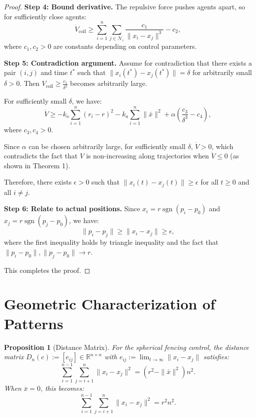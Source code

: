 \documentclass{ctexart}
\DeclareMathOperator{\sgn}{sgn}
\newtheorem{proposition}[theorem]{Proposition}
\begin{document}
\begin{proof}
\textbf{Step 4: Bound derivative.}
The repulsive force pushes agents apart, so for sufficiently close agents:
\begin{equation}
\dot{V}_{\text{coll}} \geq \sum_{i=1}^{n} \sum_{j \in \mathcal{N}_i} \frac{c_1}{\|x_i - x_j\|^3} - c_2,
\end{equation}
where $c_1, c_2 > 0$ are constants depending on control parameters.

\textbf{Step 5: Contradiction argument.}
Assume for contradiction that there exists a pair $(i,j)$ and time $t^*$ such that $\|x_i(t^*) - x_j(t^*)\| = \delta$ for arbitrarily small $\delta > 0$.
Then $V_{\text{coll}} \geq \frac{c_1}{\delta^2}$ becomes arbitrarily large.

For sufficiently small $\delta$, we have:
\begin{equation}
\dot{V} \geq -k_o \sum_{i=1}^{n} (r_i - r)^2 - k_a \sum_{i=1}^{n} \|\bar{x}\|^2 + \alpha \left( \frac{c_3}{\delta^3} - c_4 \right),
\end{equation}
where $c_3, c_4 > 0$.

Since $\alpha$ can be chosen arbitrarily large, for sufficiently small $\delta$, $\dot{V} > 0$, which contradicts the fact that $V$ is non-increasing along trajectories when $\dot{V} \leq 0$ (as shown in Theorem 1).

Therefore, there exists $\epsilon > 0$ such that $\|x_i(t) - x_j(t)\| \geq \epsilon$ for all $t \geq 0$ and all $i \neq j$.

\textbf{Step 6: Relate to actual positions.}
Since $x_i = r \sgn(p_i - p_0)$ and $x_j = r \sgn(p_j - p_0)$, we have:
\begin{equation}
\|p_i - p_j\| \geq \|x_i - x_j\| \geq \epsilon,
\end{equation}
where the first inequality holds by triangle inequality and the fact that $\|p_i - p_0\|, \|p_j - p_0\| \to r$.

This completes the proof.
\end{proof}



\section{Geometric Characterization of Patterns}

\begin{proposition}[Distance Matrix]
For the spherical fencing control, the distance matrix $D_n(c) := [e_{ij}] \in \mathbb{R}^{n \times n}$ with $e_{ij} := \lim_{t \to \infty} \|x_i - x_j\|$ satisfies:
\begin{equation}
\sum_{i=1}^{n-1} \sum_{j=i+1}^{n} \|x_i - x_j\|^2 = (r^2 - \|\bar{x}\|^2)n^2.
\end{equation}
When $\bar{x} = 0$, this becomes:
\begin{equation}
\sum_{i=1}^{n-1} \sum_{j=i+1}^{n} \|x_i - x_j\|^2 = r^2 n^2.
\end{equation}
\end{proposition}
\end{document}
